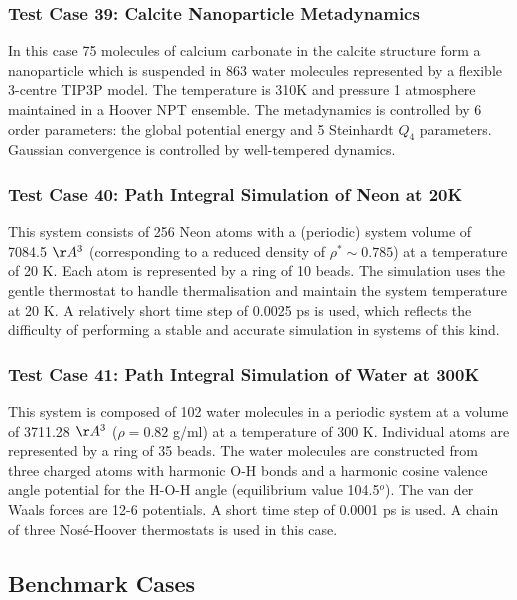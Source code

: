 \subsubsection{Test Case 39: Calcite Nanoparticle Metadynamics}
In this case 75 molecules of calcium carbonate in the calcite structure form a
nanoparticle which is suspended in 863 water molecules represented by a
flexible 3-centre TIP3P model. The temperature is 310K and pressure 1
atmosphere maintained in a Hoover NPT ensemble. The metadynamics is controlled
by 6 order parameters: the global potential energy and 5 Steinhardt $Q_{4}$
parameters. Gaussian convergence is controlled by well-tempered dynamics.

\subsubsection{Test Case 40: Path Integral Simulation of Neon at 20K}

This system consists of 256 Neon atoms with a (periodic) system volume
of 7084.5 $\AA^{3}$ (corresponding to a reduced density of $\rho^{*}
\sim 0.785$) at a temperature of 20 K. Each atom is represented by a
ring of 10 beads.  The simulation uses the gentle thermostat to handle
thermalisation and maintain the system temperature at 20 K. A
relatively short time step of 0.0025 ps is used, which reflects the
difficulty of performing a stable and accurate simulation in systems
of this kind.

\subsubsection{Test Case 41: Path Integral Simulation of Water at 300K}

This system is composed of 102 water molecules in a periodic system at
a volume of 3711.28 $\AA^{3}$ ($\rho=0.82$ g/ml) at a temperature of
300 K. Individual atoms are represented by a ring of 35 beads. The
water molecules are constructed from three charged atoms with harmonic
O-H bonds and a harmonic cosine valence angle potential for the H-O-H
angle (equilibrium value 104.5$^{o}$). The van der Waals forces are
12-6 potentials. A short time step of 0.0001 ps is used. A chain of
three Nos\'{e}-Hoover thermostats is used in this case.

\subsection{Benchmark Cases}


